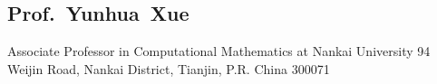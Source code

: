 \documentclass[11pt,a4paper, final]{moderncv}
\newcommand{\spacesubsection}{\vspace{0.2cm}}
\begin{document}
	\subsection{Prof.~Yunhua~Xue}
		\cvline{}
		{Associate Professor in Computational Mathematics at Nankai University}
		{94 Weijin Road, Nankai District, Tianjin, P.R. China 300071}





\clearpage
\end{document}
